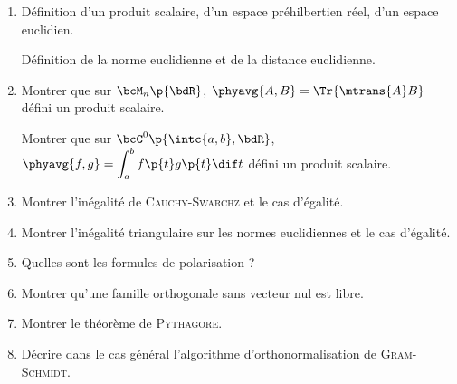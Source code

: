\documentclass[a4paper,french,bookmarks]{article}
\begin{document}
    \begin{enumerate}
        \item Définition d'un produit scalaire, d'un espace préhilbertien réel, d'un espace euclidien.
        
        Définition de la norme euclidienne et de la distance euclidienne.
        
        \boxans{
        
        }
        
        \item Montrer que sur $\bcM_n\p{\bdR}$, $\phyavg{A, B} = \Tr{\mtrans{A}B}$ défini un produit scalaire.
        
        Montrer que sur $\bcC^0\p{\intc{a, b}, \bdR}$, $\phyavg{f, g} = \displaystyle \int_a^b f\p{t}g\p{t}\dif t$ défini un produit scalaire.
        
        \boxans{
        
        }
        
        \item Montrer l'inégalité de \textsc{Cauchy}-\textsc{Swarchz} et le cas d'égalité.
        
        \boxans{
        
        }
        
        \item Montrer l'inégalité triangulaire sur les normes euclidiennes et le cas d'égalité.
        
        \boxans{
        
        }
        
        \item Quelles sont les formules de polarisation ?
        
        \boxans{
        
        }
        
        \item Montrer qu'une famille orthogonale sans vecteur nul est libre.
        
        \boxans{
        
        }
        
        \item Montrer le théorème de \textsc{Pythagore}.
        
        \boxans{
        
        }
        
        \item Décrire dans le cas général l'algorithme d'orthonormalisation de \textsc{Gram}-\textsc{Schmidt}.
        
        \boxans{
        
        }
        
    \end{enumerate}
\end{document}
